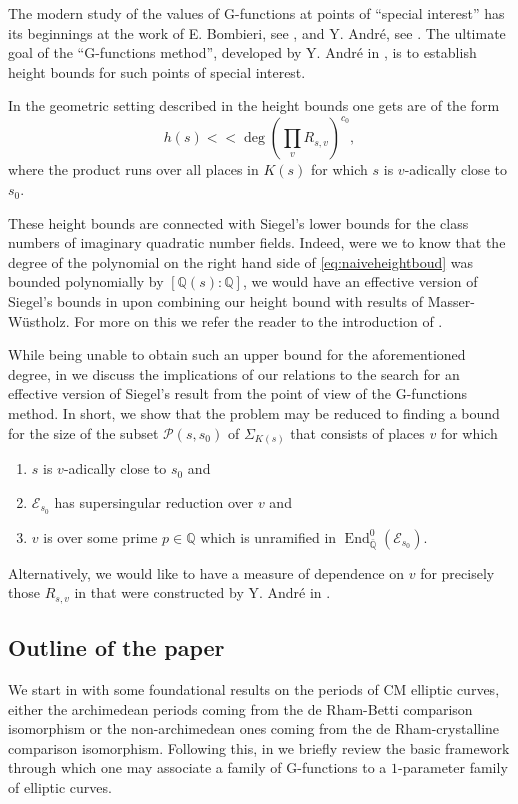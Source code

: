 \documentclass[12pt,twoside,a4paper]{article}
\theoremstyle{plain}%
\DeclareMathOperator{\End}{End}
\newcommand{\Q}{\mathbb{Q}}
\newcommand{\CE}{\mathcal{E}}
\newcommand{\CP}{\mathcal{P}}
\begin{document}
The modern study of the values of G-functions at points of ``special interest'' has its beginnings at the work of E. Bombieri, see \cite{bombg}, and Y. Andr\'e, see \cite{andre1989g}. The ultimate goal of the ``G-functions method'', developed by Y. Andr\'e in \cite{andre1989g}, is to establish height bounds for such points of special interest.

In the geometric setting described in  the height bounds one gets are of the form \begin{equation}\label{eq:naiveheightboud}
	h(s)<< \deg(\prod_{v}^{} R_{s,v})^{c_0},
\end{equation}where the product runs over all places in $K(s)$ for which $s$ is $v$-adically close to $s_0$. 

These height bounds are connected with Siegel's lower bounds for the class numbers of imaginary quadratic number fields. Indeed, were we to know that the degree of the polynomial on the right hand side of \eqref{eq:naiveheightboud} was bounded polynomially by $[\Q(s):\Q]$, we would have an effective version of Siegel's bounds in \cite{siegelog} upon combining our height bound with results of Masser-W\"ustholz. For more on this we refer the reader to the introduction of \cite{papaseffbrsieg}.

While being unable to obtain such an upper bound for the aforementioned degree, in  we discuss the implications of our relations to the search for an effective version of Siegel's result from the point of view of the G-functions method. In short, we show that the problem may be reduced to finding a bound for the size of the subset $\CP(s,s_0)$ of $\Sigma_{K(s)}$ that consists of places $v$ for which 
\begin{enumerate}
\item $s$ is $v$-adically close to $s_0$ and 
\item $\CE_{s_0}$ has supersingular reduction over $v$ and 
\item $v$ is over some prime $p\in \Q$ which is unramified in $\End^{0}_{\bar{\Q}}(\CE_{s_0})$. 
\end{enumerate}
Alternatively, we would like to have a measure of dependence on $v$ for precisely those $R_{s,v}$ in  that were constructed by Y. Andr\'e in \cite{andremots}.
\subsection{Outline of the paper}
We start in  with some foundational results on the periods of CM elliptic curves, either the archimedean periods coming from the de Rham-Betti comparison isomorphism or the non-archimedean ones coming from the de Rham-crystalline comparison isomorphism. Following this, in  we briefly review the basic framework through which one may associate a family of G-functions to a $1$-parameter family of elliptic curves. 
\end{document}
